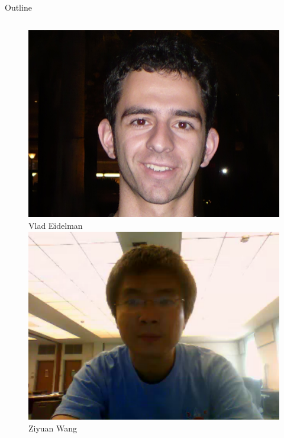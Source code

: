 \documentclass{beamer}
\begin{document}
\begin{frame}[t]{Outline}
\begin{columns}
  \begin{column}{0.2\textwidth}
    \begin{exampleblock}{}
      \begin{figure}
        \tiny
        {\centering \includegraphics[scale=0.05]{vlad.jpg}} \\
        Vlad Eidelman\\
        
        {\centering \includegraphics[scale=0.15]{ziyuan.pdf}} \\
        Ziyuan Wang\\
        

\end{figure}
\end{exampleblock}
\end{column}
\end{columns}
\end{frame}
\end{document}
